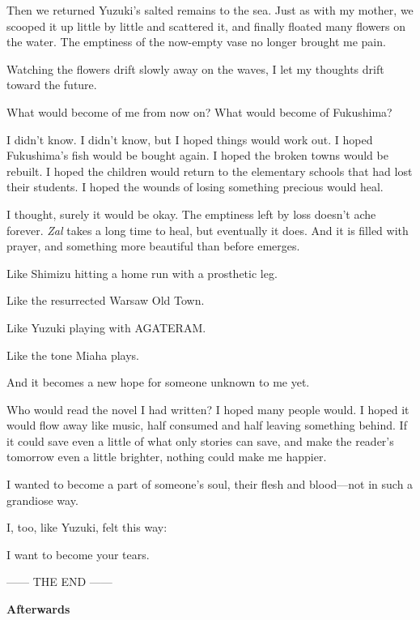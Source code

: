 \documentclass[
    a4paper,
    12pt,
    twoside,
    openany,
    UTF8,
    fontset=windows
]{ctexbook}
\begin{document}
Then we returned Yuzuki's salted remains to the sea. Just as with my mother, we scooped it up little by little and scattered it, and finally floated many flowers on the water. The emptiness of the now-empty vase no longer brought me pain.

Watching the flowers drift slowly away on the waves, I let my thoughts drift toward the future.

What would become of me from now on? What would become of Fukushima?

I didn't know. I didn't know, but I hoped things would work out. I hoped Fukushima's fish would be bought again. I hoped the broken towns would be rebuilt. I hoped the children would return to the elementary schools that had lost their students. I hoped the wounds of losing something precious would heal.

I thought, surely it would be okay. The emptiness left by loss doesn't ache forever. \textit{Zal} takes a long time to heal, but eventually it does. And it is filled with prayer, and something more beautiful than before emerges.

Like Shimizu hitting a home run with a prosthetic leg.

Like the resurrected Warsaw Old Town.

Like Yuzuki playing with AGATERAM.

Like the tone Miaha plays.

And it becomes a new hope for someone unknown to me yet.

Who would read the novel I had written? I hoped many people would. I hoped it would flow away like music, half consumed and half leaving something behind. If it could save even a little of what only stories can save, and make the reader's tomorrow even a little brighter, nothing could make me happier.

I wanted to become a part of someone's soul, their flesh and blood---not in such a grandiose way.

I, too, like Yuzuki, felt this way:

I want to become your tears.

—— THE END ——


\clearpage
\thispagestyle{plain}
\begin{center}
    \large\bfseries Afterwards
\end{center}
\label{sec:afterwards}
\vspace{1cm}
\end{document}
